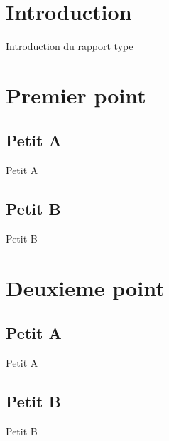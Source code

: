 \documentclass[11pt,a4paper]{article}
\begin{document}

\newpage
\tableofcontents

\newpage
\section{Introduction}
	Introduction du rapport type\\
\newpage
\section{Premier point}
	\subsection{Petit A}
	Petit A \\
	\subsection{Petit B}
	Petit B \\
	
\newpage
\section{Deuxieme point}
	\subsection{Petit A}
        Petit A \\
	\cite{1613041}
	\newpage
	\subsection{Petit B}
        Petit B \\

\newpage




 
\end{document}
